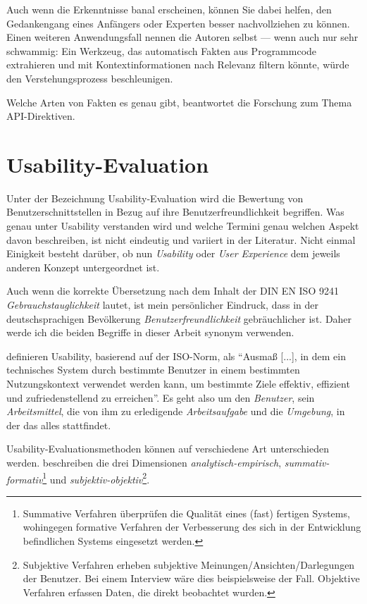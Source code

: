 Auch wenn die Erkenntnisse banal erscheinen, können Sie dabei helfen, den Gedankengang eines Anfängers oder Experten besser nachvollziehen zu können. Einen weiteren Anwendungsfall nennen die Autoren selbst --- wenn auch nur sehr schwammig: Ein Werkzeug, das automatisch Fakten aus Programmcode extrahieren und mit Kontextinformationen nach Relevanz filtern könnte, würde den Verstehungsprozess beschleunigen.

Welche Arten von Fakten es genau gibt, beantwortet die Forschung zum Thema API-Direktiven.




\section{Usability-Evaluation}

\label{sec:def-usability}
Unter der Bezeichnung Usability-Evaluation wird die Bewertung von Benutzerschnittstellen in Bezug auf ihre Benutzerfreundlichkeit begriffen. Was genau unter Usability verstanden wird und welche Termini genau welchen Aspekt davon beschreiben, ist nicht eindeutig und variiert in der Literatur. Nicht einmal Einigkeit besteht darüber, ob nun \textit{Usability} oder \textit{User Experience} dem jeweils anderen Konzept untergeordnet ist. \citep{Kahlert:2011wr}

Auch wenn die korrekte Übersetzung nach dem Inhalt der DIN EN ISO 9241 \textit{Gebrauchstauglichkeit} lautet, ist mein persönlicher Eindruck, dass in der deutschsprachigen Bevölkerung \textit{Benutzerfreundlichkeit} gebräuchlicher ist. Daher werde ich die beiden Begriffe in dieser Arbeit synonym verwenden.

\cite{Sarodnick:2006vc} definieren Usability, basierend auf der ISO-Norm, als ``Ausmaß [...], in dem ein technisches System durch bestimmte Benutzer in einem bestimmten Nutzungskontext verwendet werden kann, um bestimmte Ziele effektiv, effizient und zufriedenstellend zu erreichen''. Es geht also um den \textit{Benutzer}, sein \textit{Arbeitsmittel}, die von ihm zu erledigende \textit{Arbeitsaufgabe} und die \textit{Umgebung}, in der das alles stattfindet.

Usability-Evaluationsmethoden können auf verschiedene Art unterschieden werden. \cite{Sarodnick:2006vc} beschreiben die drei Dimensionen \textit{analytisch-empirisch}, \textit{summativ-formativ}\footnote{Summative Verfahren überprüfen die Qualität eines (fast) fertigen Systems, wohingegen formative Verfahren der Verbesserung des sich in der Entwicklung befindlichen Systems eingesetzt werden.} und \textit{subjektiv-objektiv}\footnote{Subjektive Verfahren erheben subjektive Meinungen/Ansichten/Darlegungen der Benutzer. Bei einem Interview wäre dies beispielsweise der Fall. Objektive Verfahren erfassen Daten, die direkt beobachtet wurden.}.

